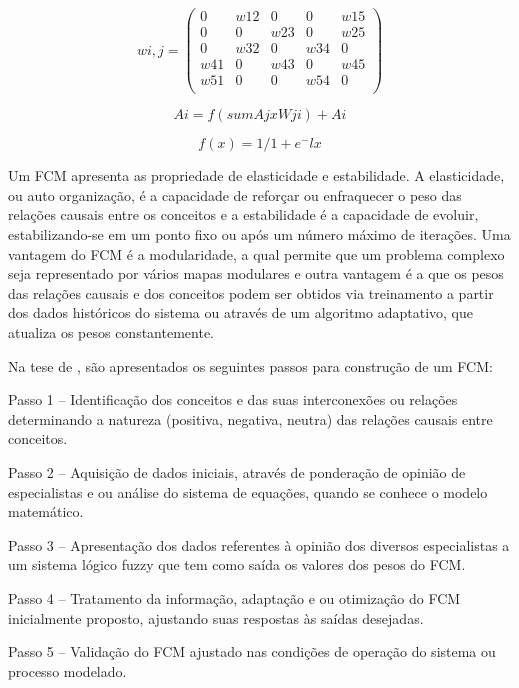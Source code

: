 \begin{equation}\label{fcm-matrix}
    wi,j=\left(
       \begin{array}{ccccc}
         0 & w12 & 0 & 0 & w15 \\
         0 & 0 & w23 & 0 & w25 \\
         0 & w32 & 0 & w34 & 0 \\
         w41 & 0 & w43 & 0 & w45 \\
         w51 & 0 & 0 & w54 & 0 \\
       \end{array}
     \right)
\end{equation}

\begin{equation}\label{fcm-update}
Ai=f(sum{AjxWji})+Ai
\end{equation}

\begin{equation}\label{sigmoide}
f(x)={1}/{1+e^-lx}
\end{equation}

Um FCM apresenta as propriedade de elasticidade e estabilidade. A elasticidade, ou auto organização, é a capacidade de reforçar ou enfraquecer o peso das relações causais entre os conceitos e a estabilidade é a capacidade de evoluir, estabilizando-se em um ponto fixo ou após um número máximo de iterações. Uma vantagem do FCM é a modularidade, a qual permite que um problema complexo seja representado por vários mapas modulares e outra vantagem é a que os pesos das relações causais e dos conceitos podem ser obtidos via treinamento a partir dos dados históricos do sistema ou através de um algoritmo adaptativo, que atualiza os pesos constantemente.

Na tese de \cite{FCMENDONCA}, são apresentados os seguintes passos para construção de um FCM:

\begin{list}{*}{}
\item Passo 1 – Identificação dos conceitos e das suas interconexões ou relações
determinando a natureza (positiva, negativa, neutra) das relações causais entre
conceitos.
\item Passo 2 – Aquisição de dados iniciais, através de ponderação de opinião de
especialistas e ou análise do sistema de equações, quando se conhece o modelo
matemático.
\item Passo 3 – Apresentação dos dados referentes à opinião dos diversos especialistas a
um sistema lógico fuzzy que tem como saída os valores dos pesos do FCM.
\item Passo 4 – Tratamento da informação, adaptação e ou otimização do FCM
inicialmente proposto, ajustando suas respostas às saídas desejadas.
\item Passo 5 – Validação do FCM ajustado nas condições de operação do sistema ou
processo modelado.
\end{list}

